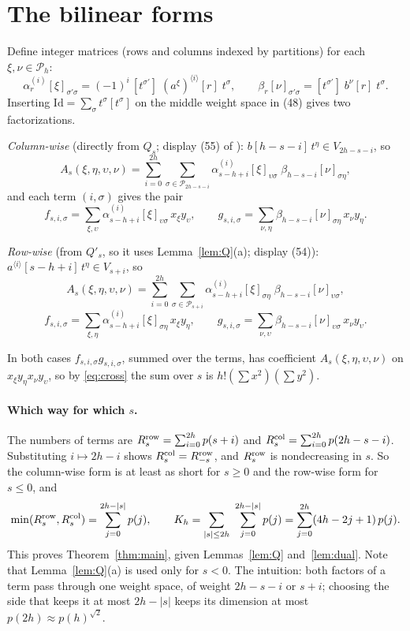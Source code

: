 \documentclass[11pt]{amsart}
\theoremstyle{remark}
\newcommand{\cP}{\mathcal{P}}
\begin{document}
\section{The bilinear forms}\label{sec:forms}

Define integer matrices (rows and columns indexed by partitions) for each $\xi,\nu\in\cP_h$:
\[
\alpha^{(i)}_r[\xi]_{\sigma'\sigma}=(-1)^i\,[t^{\sigma'}]\;(a^\xi)^{\langle i\rangle}[r]\;t^\sigma,\qquad
\beta_r[\nu]_{\sigma'\sigma}=[t^{\sigma'}]\;b^\nu[r]\;t^\sigma .
\]
Inserting $\mathrm{Id}=\sum_\sigma t^\sigma[t^\sigma]$ on the middle weight space in (48) gives two factorizations.

\emph{Column-wise} (directly from $Q_s$; display (55) of \cite{ETH}): $b[h-s-i]\,t^\eta\in V_{2h-s-i}$, so
\[
A_s(\xi,\eta,\upsilon,\nu)=\sum_{i=0}^{2h}\sum_{\sigma\in\cP_{2h-s-i}}\alpha^{(i)}_{s-h+i}[\xi]_{\upsilon\sigma}\;\beta_{h-s-i}[\nu]_{\sigma\eta},
\]
and each term $(i,\sigma)$ gives the pair
\[
f_{s,i,\sigma}=\sum_{\xi,\upsilon}\alpha^{(i)}_{s-h+i}[\xi]_{\upsilon\sigma}\,x_\xi y_\upsilon,\qquad
g_{s,i,\sigma}=\sum_{\nu,\eta}\beta_{h-s-i}[\nu]_{\sigma\eta}\,x_\nu y_\eta .
\]

\emph{Row-wise} (from $Q'_s$, so it uses Lemma~\ref{lem:Q}(a); display (54)): $a^{\langle i\rangle}[s-h+i]\,t^\eta\in V_{s+i}$, so
\[
A_s(\xi,\eta,\upsilon,\nu)=\sum_{i=0}^{2h}\sum_{\sigma\in\cP_{s+i}}\alpha^{(i)}_{s-h+i}[\xi]_{\sigma\eta}\;\beta_{h-s-i}[\nu]_{\upsilon\sigma},
\]
\[
f_{s,i,\sigma}=\sum_{\xi,\eta}\alpha^{(i)}_{s-h+i}[\xi]_{\sigma\eta}\,x_\xi y_\eta,\qquad
g_{s,i,\sigma}=\sum_{\nu,\upsilon}\beta_{h-s-i}[\nu]_{\upsilon\sigma}\,x_\nu y_\upsilon .
\]

In both cases $f_{s,i,\sigma}g_{s,i,\sigma}$, summed over the terms, has coefficient $A_s(\xi,\eta,\upsilon,\nu)$ on
$x_\xi y_\eta x_\nu y_\upsilon$, so by \eqref{eq:cross} the sum over $s$ is $h!(\sum x^2)(\sum y^2)$.

\paragraph{Which way for which $s$.} The numbers of terms are $R^{\rm row}_s=\sum_{i=0}^{2h}p(s+i)$ and
$R^{\rm col}_s=\sum_{i=0}^{2h}p(2h-s-i)$. Substituting $i\mapsto 2h-i$ shows $R^{\rm col}_s=R^{\rm row}_{-s}$, and
$R^{\rm row}_s$ is nondecreasing in $s$. So the column-wise form is at least as short for $s\ge0$ and the row-wise
form for $s\le0$, and
\[
\min(R^{\rm row}_s,R^{\rm col}_s)=\sum_{j=0}^{2h-|s|}p(j),\qquad
K_h=\sum_{|s|\le2h}\ \sum_{j=0}^{2h-|s|}p(j)=\sum_{j=0}^{2h}(4h-2j+1)\,p(j).
\]
This proves Theorem~\ref{thm:main}, given Lemmas~\ref{lem:Q} and~\ref{lem:dual}. Note that Lemma~\ref{lem:Q}(a)
is used only for $s<0$. The intuition: both factors of a term pass through one weight space, of weight $2h-s-i$
or $s+i$; choosing the side that keeps it at most $2h-|s|$ keeps its dimension at most $p(2h)\approx p(h)^{\sqrt2}$.
\end{document}
